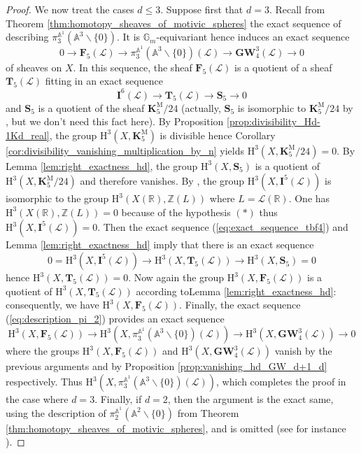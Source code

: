 \documentclass[11pt,leqno]{amsart}
\newcommand{\GW}{\mathbf{GW}}
\renewcommand{\1}{{\rm 1\hspace*{-0.4ex}%
\rule{0.1ex}{1.52ex}\hspace*{0.2ex}}}
\renewcommand{\Lc}{{\mathcal L}}
\newcommand{\Hr}{{\mathrm {H}}}
\newcommand{\<}[1]{{\langle}#1 {\rangle}}
\newcommand{\Ibf}{\mathbf{I}}
\newcommand{\Rb}{\mathbb{R}}
\newcommand{\Zb}{\mathbb{Z}}
\newcommand{\Kbf}{\mathbf{K}}
\newcommand{\Abb}{\mathbb{A}}
\newcommand{\Mr}{\mathrm{M}}
\newcommand{\Tbf}{\mathbf{T}}
\newcommand{\Sbf}{\mathbf{S}}
\newcommand{\Fbf}{\mathbf{F}}
\theoremstyle{plain}
\theoremstyle{definition}
\theoremstyle{remark}
\numberwithin{equation}{section}
\begin{document}
\begin{proof}
We now treat the cases $d\leq 3$. Suppose first that $d=3$. Recall from Theorem \ref{thm:homotopy_sheaves_of_motivic_spheres} the exact sequence of describing $\pi_3^{\Abb^1}(\Abb^3\smallsetminus \{0\})$. It is $\mathbb{G}_m$-equivariant hence induces an exact sequence
\begin{equation}\label{eq:description_pi_2}
0\rightarrow\Fbf_5(\Lc)\rightarrow\pi_3^{\Abb^1}(\Abb^3\smallsetminus \{0\})(\Lc)\rightarrow\GW_4^3(\Lc)\rightarrow 0 
\end{equation}
of sheaves on $X$. In this sequence, the  sheaf $\Fbf_5(\Lc)$ is a quotient of a sheaf $\Tbf_5(\Lc)$ fitting in an exact sequence
\begin{equation}\label{eq:exact_sequence_tbf4}
\Ibf^{6}(\Lc)\rightarrow\Tbf_{5}(\Lc)\rightarrow\Sbf_5\rightarrow 0
\end{equation}
and $\Sbf_5$ is a quotient of the sheaf $\Kbf_5^\Mr/24$ (actually, $\Sbf_5$ is isomorphic to $\Kbf_5^\Mr/24$ by \cite{asokMotivicspheres20}, but we don't need this fact here). By Proposition \ref{prop:divisibility_Hd-1Kd_real}, the group $\Hr^3(X,\Kbf_5^\Mr)$ is divisible hence Corollary \ref{cor:divisibility_vanishing_multiplication_by_n} yields $\Hr^3(X,\Kbf_5^\Mr/24)=0$. By Lemma \ref{lem:right_exactness_hd}, the group $\Hr^3(X,\Sbf_5)$ is a quotient of $\Hr^3(X,\Kbf_5^\Mr/24)$ and therefore vanishes. By \cite[Corollary 8.11]{jacobsonRealCohomologyPowers2017}, the group $\Hr^3(X,\Ibf^5(\Lc))$ is isomorphic to the group $\Hr^3(X(\Rb),\Zb(L))$ where $L=\Lc(\Rb)$. One has $\Hr^3(X(\Rb),\Zb(L))=0$ because of the hypothesis $(*)$ thus $\Hr^3(X,\Ibf^5(\Lc))=0$. Then the exact sequence (\ref{eq:exact_sequence_tbf4}) and Lemma \ref{lem:right_exactness_hd} imply that there is an exact sequence \[0=\Hr^3(X,\Ibf^5(\Lc))\rightarrow\Hr^3(X,\Tbf_5(\Lc))\rightarrow\Hr^3(X,\Sbf_5)=0\] hence $\Hr^3(X,\Tbf_5(\Lc))=0$. Now again the group $\Hr^3(X,\Fbf_5(\Lc))$ is a quotient of $\Hr^3(X,\Tbf_5(\Lc))$ according toLemma \ref{lem:right_exactness_hd}: consequently, we have $\Hr^3(X,\Fbf_5(\Lc))$. Finally, the exact sequence (\ref{eq:description_pi_2}) provides an exact sequence \[\Hr^3(X,\Fbf_5(\Lc))\rightarrow\Hr^3(X,\pi_3^{\Abb^1}(\Abb^3\smallsetminus \{0\})(\Lc))\rightarrow\Hr^3(X,\GW_4^3(\Lc))\rightarrow 0\] where the groups $\Hr^3(X,\Fbf_5(\Lc))$ and $\Hr^3(X,\GW_4^3(\Lc))$ vanish by the previous arguments and by Proposition \ref{prop:vanishing_hd_GW_d+1_d} respectively. Thus $\Hr^3(X,\pi_3^{\Abb^1}(\Abb^3\smallsetminus \{0\})(\Lc))$, which completes the proof in the case where $d=3$. Finally, if $d=2$, then the argument is the exact same, using the description of $\pi_2^{\Abb^1}(\Abb^2\smallsetminus \{0\})$ from Theorem \ref{thm:homotopy_sheaves_of_motivic_spheres}, and is omitted (see for instance \cite[Proposition 3.11]{lerbetCohomologicalClassificationVector2026}).
\end{proof}
\end{document}
